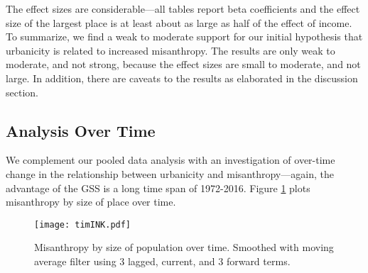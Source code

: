 \documentclass[11pt, letterpaper]{article}
\begin{document}
\begin{spacing}{1.4}
 




The effect sizes are considerable---all tables report beta coefficients
and the effect size of the largest place is at least about as large as half of the effect
of income.  To summarize, we find a weak to moderate support for our initial
hypothesis that urbanicity is related to increased misanthropy. The results are
only weak to moderate, and not strong, because the effect sizes are small to
moderate, and not large. In addition, there are caveats to the results as elaborated in the discussion section.

\newpage
\subsection*{Analysis Over Time}

We complement our pooled data analysis with an investigation of over-time change
in the relationship between urbanicity and misanthropy---again, the advantage of the GSS
is a long time span of 1972-2016. Figure \ref{tim} plots misanthropy by size of
place over time.

\begin{figure}[H]
  \texttt{[image: timINK.pdf]}\centering
\caption{Misanthropy by size of population over time. Smoothed with moving average filter using 3 lagged, current, and 3 forward terms.}\label{tim}%
\end{figure}


\end{spacing}
\end{document}
